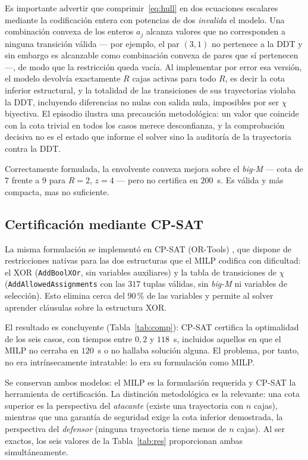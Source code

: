 \documentclass[conference]{IEEEtran}
\begin{document}
Es importante advertir que comprimir~\eqref{eq:hull} en dos ecuaciones escalares mediante
la codificación entera con potencias de dos \emph{invalida} el modelo. Una combinación
convexa de los enteros $a_j$ alcanza valores que no corresponden a ninguna transición
válida --- por ejemplo, el par $(3,1)$ no pertenece a la DDT y sin embargo es alcanzable
como combinación convexa de pares que sí pertenecen ---, de modo que la restricción queda
vacía. Al implementar por error esa versión, el modelo devolvía exactamente $R$ cajas
activas para todo $R$, es decir la cota inferior estructural, y la totalidad de las
transiciones de sus trayectorias violaba la DDT, incluyendo diferencias no nulas con
salida nula, imposibles por ser $\chi$ biyectiva. El episodio ilustra una precaución
metodológica: un valor que coincide con la cota trivial en todos los casos merece
desconfianza, y la comprobación decisiva no es el estado que informe el solver sino la
auditoría de la trayectoria contra la DDT.

Correctamente formulada, la envolvente convexa mejora sobre el \emph{big-M} --- cota de
$7$ frente a $9$ para $R=2$, $z=4$ --- pero no certifica en $200$~s. Es válida y más
compacta, mas no suficiente.

\subsection{Certificación mediante CP-SAT}\label{sec:cpsat}

La misma formulación se implementó en CP-SAT (OR-Tools) \cite{ortools}, que dispone de
restricciones nativas para las dos estructuras que el MILP codifica con dificultad: el XOR
(\texttt{AddBoolXOr}, sin variables auxiliares) y la tabla de transiciones de $\chi$
(\texttt{AddAllowedAssignments} con las $317$ tuplas válidas, sin \emph{big-M} ni
variables de selección). Esto elimina cerca del $90\,\%$ de las variables y permite al
solver aprender cláusulas sobre la estructura XOR.

El resultado es concluyente (Tabla~\ref{tab:comp}): CP-SAT certifica la optimalidad de los
seis casos, con tiempos entre $0{,}2$ y $118$~s, incluidos aquellos en que el MILP no
cerraba en $120$~s o no hallaba solución alguna. El problema, por tanto, no era
intrínsecamente intratable: lo era su formulación como MILP.

Se conservan ambos modelos: el MILP es la formulación requerida y CP-SAT la herramienta de
certificación. La distinción metodológica es la relevante: una cota superior es la
perspectiva del \emph{atacante} (existe una trayectoria con $n$ cajas), mientras que una
garantía de seguridad exige la cota inferior demostrada, la perspectiva del
\emph{defensor} (ninguna trayectoria tiene menos de $n$ cajas). Al ser exactos, los seis
valores de la Tabla~\ref{tab:res} proporcionan ambas simultáneamente.
\end{document}
